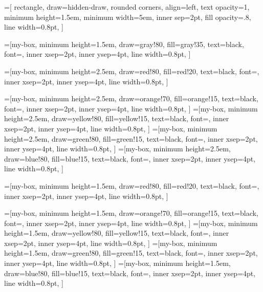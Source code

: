 
=[
    rectangle,
    draw=hidden-draw,
    rounded corners,
    align=left,
    text opacity=1,
    minimum height=1.5em,
    minimum width=5em,
    inner sep=2pt,
    fill opacity=.8,
    line width=0.8pt,
]

=[my-box, minimum height=1.5em,
    draw=gray!80, 
    fill=gray!35,  
    text=black, font=\normalsize,
    inner xsep=2pt,
    inner ysep=4pt,
    line width=0.8pt,
]

=[my-box, minimum height=2.5em,
    draw=red!80, 
    fill=red!20,  
    text=black, font=\normalsize,
    inner xsep=2pt,
    inner ysep=4pt,
    line width=0.8pt,
]

=[my-box, minimum height=2.5em,
    draw=orange!70, 
    fill=orange!15,  
    text=black, font=\normalsize,
    inner xsep=2pt,
    inner ysep=4pt,
    line width=0.8pt,
]
=[my-box, minimum height=2.5em,
    draw=yellow!80, 
    fill=yellow!15,  
    text=black, font=\normalsize,
    inner xsep=2pt,
    inner ysep=4pt,
    line width=0.8pt,
]
=[my-box, minimum height=2.5em,
    draw=green!80, 
    fill=green!15,  
    text=black, font=\normalsize,
    inner xsep=2pt,
    inner ysep=4pt,
    line width=0.8pt,
]
=[my-box, minimum height=2.5em,
    draw=blue!80, 
    fill=blue!15,  
    text=black, font=\normalsize,
    inner xsep=2pt,
    inner ysep=4pt,
    line width=0.8pt,
]

=[my-box, minimum height=1.5em,
    draw=red!80, 
    fill=red!20,  
    text=black, font=\normalsize,
    inner xsep=2pt,
    inner ysep=4pt,
    line width=0.8pt,
]

=[my-box, minimum height=1.5em,
    draw=orange!70, 
    fill=orange!15,  
    text=black, font=\normalsize,
    inner xsep=2pt,
    inner ysep=4pt,
    line width=0.8pt,
]
=[my-box, minimum height=1.5em,
    draw=yellow!80, 
    fill=yellow!15,  
    text=black, font=\normalsize,
    inner xsep=2pt,
    inner ysep=4pt,
    line width=0.8pt,
]
=[my-box, minimum height=1.5em,
    draw=green!80, 
    fill=green!15,  
    text=black, font=\normalsize,
    inner xsep=2pt,
    inner ysep=4pt,
    line width=0.8pt,
]
=[my-box, minimum height=1.5em,
    draw=blue!80, 
    fill=blue!15,  
    text=black, font=\normalsize,
    inner xsep=2pt,
    inner ysep=4pt,
    line width=0.8pt,
]

